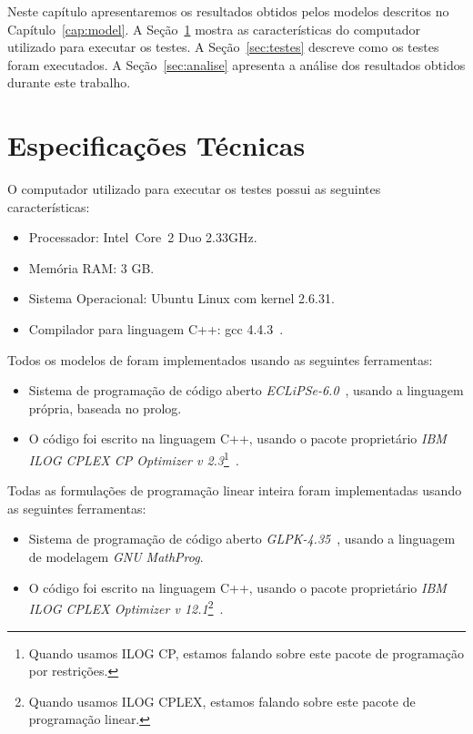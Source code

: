Neste capítulo apresentaremos os resultados obtidos pelos modelos
descritos no Capítulo~\ref{cap:model}. A Seção~\ref{sec:tspec} mostra as
características do computador utilizado para executar os testes. A
Seção~\ref{sec:testes} descreve como os testes foram executados. A
Seção~\ref{sec:analise} apresenta a análise dos resultados obtidos
durante este trabalho.

\section{Especificações Técnicas}
\label{sec:tspec}
O computador utilizado para executar os testes possui as seguintes
características:

\begin{itemize}

    \item{Processador: Intel\textregistered{}~Core\texttrademark~2 Duo
        2.33GHz.}

    \item{Memória RAM: 3 GB.}

    \item{Sistema Operacional: Ubuntu Linux com kernel 2.6.31.}

    \item{Compilador para linguagem C++: gcc 4.4.3~\cite{gcc*2012}.}

\end{itemize}

Todos os modelos de \pr{} foram implementados usando as seguintes
ferramentas:

\begin{itemize}
    \item{Sistema de programação de código aberto
        \textit{ECLiPSe-6.0}~\cite{eclipse*2009}, usando a linguagem
        própria, baseada no prolog.}

    \item{O código foi escrito na linguagem C++, usando o pacote
        proprietário \textit{IBM\textregistered{} ILOG\textregistered{}
        CPLEX\textregistered{} CP Optimizer v 2.3}\footnote{Quando
        usamos ILOG CP, estamos falando sobre este pacote de programação
        por restrições.}~\cite{ilogcp*2011}.}
\end{itemize}

Todas as formulações de programação linear inteira foram implementadas
usando as seguintes ferramentas:

\begin{itemize}
    \item{Sistema de programação de código
        aberto \textit{GLPK-4.35}~\cite{glpk*2010}, usando a linguagem
        de modelagem \textit{GNU MathProg}.}

    \item{O código foi escrito na linguagem C++, usando o pacote
        proprietário \textit{IBM\textregistered{} ILOG\textregistered{}
        CPLEX\textregistered{} Optimizer v 12.1}\footnote{Quando usamos
        ILOG CPLEX, estamos falando sobre este pacote de programação
        linear.}~\cite{ilogcplex*2011}.}
\end{itemize}

